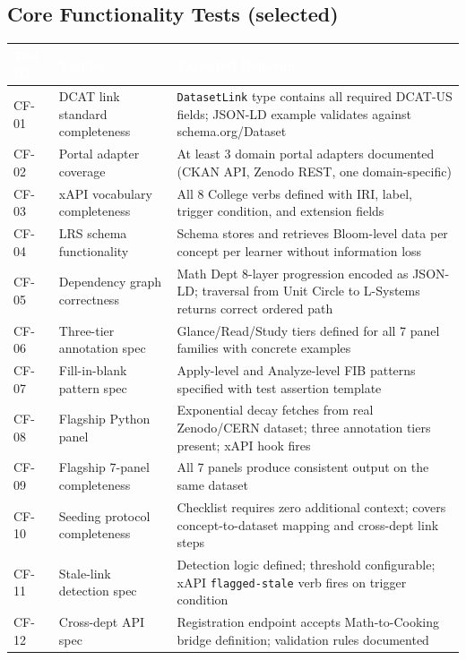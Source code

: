 \documentclass[11pt,letterpaper]{article}
\newcommand{\tableheader}[1]{\textbf{\sffamily\textcolor{white}{#1}}}
\begin{document}
\subsection{Core Functionality Tests (selected)}

\begin{center}
\begin{tabularx}{\textwidth}{L{1.5cm}L{4cm}X}
\toprule
{}
\tableheader{Test ID} & \tableheader{Verifies} & \tableheader{Expected Behavior} \\
\midrule
CF-01 & DCAT link standard completeness & \texttt{DatasetLink} type contains all required DCAT-US fields; JSON-LD example validates against schema.org/Dataset \\
CF-02 & Portal adapter coverage & At least 3 domain portal adapters documented (CKAN API, Zenodo REST, one domain-specific) \\
CF-03 & xAPI vocabulary completeness & All 8 College verbs defined with IRI, label, trigger condition, and extension fields \\
CF-04 & LRS schema functionality & Schema stores and retrieves Bloom-level data per concept per learner without information loss \\
CF-05 & Dependency graph correctness & Math Dept 8-layer progression encoded as JSON-LD; traversal from Unit Circle to L-Systems returns correct ordered path \\
CF-06 & Three-tier annotation spec & Glance/Read/Study tiers defined for all 7 panel families with concrete examples \\
CF-07 & Fill-in-blank pattern spec & Apply-level and Analyze-level FIB patterns specified with test assertion template \\
CF-08 & Flagship Python panel & Exponential decay fetches from real Zenodo/CERN dataset; three annotation tiers present; xAPI hook fires \\
CF-09 & Flagship 7-panel completeness & All 7 panels produce consistent output on the same dataset \\
CF-10 & Seeding protocol completeness & Checklist requires zero additional context; covers concept-to-dataset mapping and cross-dept link steps \\
CF-11 & Stale-link detection spec & Detection logic defined; threshold configurable; xAPI \texttt{flagged-stale} verb fires on trigger condition \\
CF-12 & Cross-dept API spec & Registration endpoint accepts Math-to-Cooking bridge definition; validation rules documented \\
\bottomrule
\end{tabularx}
\end{center}
\end{document}
